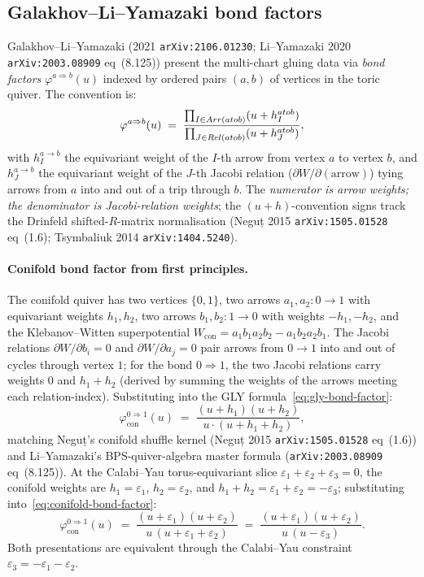 \subsection{Galakhov--Li--Yamazaki bond factors}

Galakhov--Li--Yamazaki (2021 \texttt{arXiv:2106.01230}; Li--Yamazaki 2020
\texttt{arXiv:2003.08909} eq~(8.125)) present the multi-chart gluing data
via \emph{bond factors} $\varphi^{a \Rightarrow b}(u)$ indexed by ordered
pairs $(a, b)$ of vertices in the toric quiver.  The convention is:
\begin{equation}\label{eq:gly-bond-factor}
  \varphi^{a \Rightarrow b}(u)
  \;=\;
  \frac{\prod_{I \in \mathrm{Arr}(a \to b)} (u + h^{a \to b}_I)}{%
        \prod_{J \in \mathrm{Rel}(a \to b)} (u + h^{a \to b}_J)},
\end{equation}
with $h^{a\to b}_I$ the equivariant weight of the $I$-th arrow from
vertex $a$ to vertex $b$, and $h^{a\to b}_J$ the equivariant weight of
the $J$-th Jacobi relation ($\partial W / \partial (\text{arrow})$) tying
arrows from $a$ into and out of a trip through $b$.  The \emph{numerator
is arrow weights; the denominator is Jacobi-relation weights}; the
$(u + h)$-convention signs track the Drinfeld shifted-$R$-matrix
normalisation (Neguț 2015 \texttt{arXiv:1505.01528} eq~(1.6);
Tsymbaliuk 2014 \texttt{arXiv:1404.5240}).

\paragraph{Conifold bond factor from first principles.}
The conifold quiver has two vertices $\{0, 1\}$, two arrows
$a_1, a_2 : 0 \to 1$ with equivariant weights $h_1, h_2$, two arrows
$b_1, b_2 : 1 \to 0$ with weights $-h_1, -h_2$, and the Klebanov--Witten
superpotential $W_{\mathrm{con}} = a_1 b_1 a_2 b_2 - a_1 b_2 a_2 b_1$.
The Jacobi relations $\partial W / \partial b_i = 0$ and $\partial W /
\partial a_j = 0$ pair arrows from $0 \to 1$ into and out of cycles
through vertex $1$; for the bond $0 \Rightarrow 1$, the two Jacobi
relations carry weights $0$ and $h_1 + h_2$ (derived by summing the
weights of the arrows meeting each relation-index).  Substituting into
the GLY formula~\eqref{eq:gly-bond-factor}:
\begin{equation}\label{eq:conifold-bond-factor}
  \varphi^{0 \Rightarrow 1}_{\mathrm{con}}(u)
  \;=\;
  \frac{(u + h_1)(u + h_2)}{u \cdot (u + h_1 + h_2)},
\end{equation}
matching Neguț's conifold shuffle kernel (Neguț 2015
\texttt{arXiv:1505.01528} eq~(1.6)) and Li--Yamazaki's
BPS-quiver-algebra master formula (\texttt{arXiv:2003.08909} eq~(8.125)).
At the Calabi--Yau torus-equivariant slice $\varepsilon_1 + \varepsilon_2
+ \varepsilon_3 = 0$, the conifold weights are $h_1 = \varepsilon_1$,
$h_2 = \varepsilon_2$, and $h_1 + h_2 = \varepsilon_1 + \varepsilon_2 =
-\varepsilon_3$; substituting into~\eqref{eq:conifold-bond-factor}:
\[
  \varphi^{0 \Rightarrow 1}_{\mathrm{con}}(u)
  \;=\;
  \frac{(u + \varepsilon_1)(u + \varepsilon_2)}{u\,(u + \varepsilon_1 + \varepsilon_2)}
  \;=\;
  \frac{(u + \varepsilon_1)(u + \varepsilon_2)}{u\,(u - \varepsilon_3)}.
\]
Both presentations are equivalent through the Calabi--Yau constraint
$\varepsilon_3 = -\varepsilon_1 - \varepsilon_2$.


